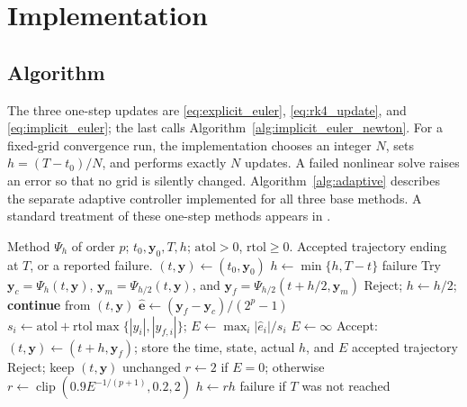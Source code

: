\section{Implementation}

\subsection{Algorithm}
The three one-step updates are \eqref{eq:explicit_euler},
\eqref{eq:rk4_update}, and \eqref{eq:implicit_euler}; the last calls
Algorithm~\ref{alg:implicit_euler_newton}. For a fixed-grid convergence
run, the implementation chooses an integer $N$, sets
$h=(T-t_0)/N$, and performs exactly $N$ updates. A failed nonlinear
solve raises an error so that no grid is silently changed.
Algorithm~\ref{alg:adaptive} describes the separate adaptive
controller implemented for all three base methods. A standard
treatment of these one-step methods appears in \cite{hairer1993}.

\begin{algorithm}[htbp]
\caption{Step-doubling adaptive integration}
\label{alg:adaptive}
\footnotesize
\begin{algorithmic}[1]
\Require Method $\Psi_h$ of order $p$; $t_0,\mathbf y_0,T,h$;
  $\mathrm{atol}>0$, $\mathrm{rtol}\geq0$.
\Ensure Accepted trajectory ending at $T$, or a reported failure.
\State $(t,\mathbf y)\gets(t_0,\mathbf y_0)$
    \State $h\gets\min\{h,T-t\}$
        \State \Return failure
    \EndIf
    \State Try $\mathbf y_c=\Psi_h(t,\mathbf y)$,
      $\mathbf y_m=\Psi_{h/2}(t,\mathbf y)$, and
      $\mathbf y_f=\Psi_{h/2}(t+h/2,\mathbf y_m)$
        \State Reject; $h\gets h/2$; \textbf{continue} from $(t,\mathbf y)$
    \EndIf
    \State $\widehat{\mathbf e}\gets
      (\mathbf y_f-\mathbf y_c)/(2^p-1)$
    \State $s_i\gets \mathrm{atol}+
      \mathrm{rtol}\max\{|y_i|,|y_{f,i}|\}$;
      $E\gets\max_i|\widehat e_i|/s_i$
        \State $E\gets\infty$
    \EndIf
        \State Accept: $(t,\mathbf y)\gets(t+h,\mathbf y_f)$;
          store the time, state, actual $h$, and $E$
            \State \Return accepted trajectory
        \EndIf
    \Else
        \State Reject; keep $(t,\mathbf y)$ unchanged
    \EndIf
    \State $r\gets 2$ if $E=0$; otherwise
      $r\gets\operatorname{clip}(0.9E^{-1/(p+1)},0.2,2)$
    \State $h\gets rh$
\EndWhile
\State \Return failure if $T$ was not reached
\end{algorithmic}
\end{algorithm}

